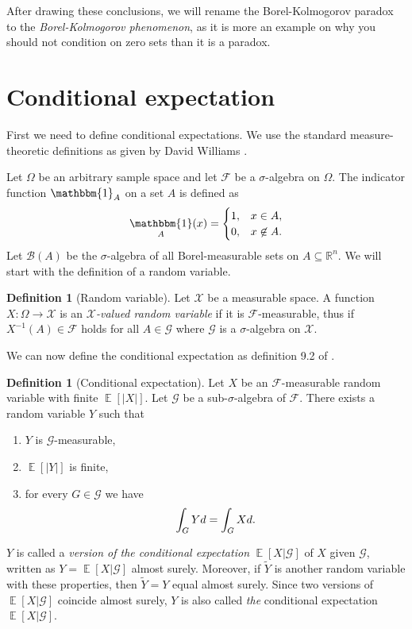 \documentclass[a4paper]{report}
\theoremstyle{plain}
\theoremstyle{definition}
\newtheorem{definition}[theorem]{Definition}
\theoremstyle{remark}
\numberwithin{equation}{chapter}
\newcommand{\R}{\mathbb{R}}
\let\P\relax
\DeclareMathOperator{\P}{\mathbb{P}}
\DeclareMathOperator{\E}{\mathbb{E}}
\DeclareMathOperator{\1}{\mathbbm{1}}
\newcommand{\F}{\mathcal{F}}
\renewcommand{\G}{\mathcal{G}}
\newcommand{\B}{\mathcal{B}}
\newcommand{\X}{\mathcal{X}}
\begin{document}
After drawing these conclusions, we will rename the Borel-Kolmogorov paradox to the \emph{Borel-Kolmogorov phenomenon}, as it is more an example on why you should not condition on zero sets than it is a paradox.

\section{Conditional expectation}
First we need to define conditional expectations. We use the standard measure-theoretic definitions as given by David Williams \cite{Williams91}.

Let $\Omega$ be an arbitrary sample space and let $\mathcal{F}$ be a $\sigma$-algebra on $\Omega$. The indicator function $\1_A$ on a set $A$ is defined as
\begin{equation}
\1_A(x)=\begin{cases}1,&x\in A,\\0,&x\not\in A.\end{cases}
\end{equation}
Let $\B(A)$ be the $\sigma$-algebra of all Borel-measurable sets on $A\subseteq\R^n$. We will start with the definition of a random variable.

\begin{definition}[Random variable]
Let $\X$ be a measurable space. A function $X\colon\Omega\to\X$ is an \emph{$\X$-valued random variable} if it is $\F$-measurable, thus if $X^{-1}(A)\in\F$ holds for all $A\in\G$ where $\G$ is a $\sigma$-algebra on $\X$.
\end{definition}

We can now define the conditional expectation as definition 9.2 of \cite{Williams91}.

\begin{definition}[Conditional expectation]\label{def:conexp}
Let $X$ be an $\F$-measurable random variable with finite $\E[|X|]$. Let $\G$ be a sub-$\sigma$-algebra of $\F$. There exists a random variable $Y$ such that
\begin{enumerate}
\item $Y$ is $\G$-measurable,
\item $\E[|Y|]$ is finite,
\item for every $G\in\G$ we have
\begin{equation}
\int_G Yd\P=\int_G Xd\P.
\end{equation}
\end{enumerate}
$Y$ is called a \emph{version of the conditional expectation} $\E[X|\G]$ of $X$ given $\G$, written as $Y=\E[X|\G]$ almost surely. Moreover, if $\tilde{Y}$ is another random variable with these properties, then $\tilde{Y}=Y$ equal almost surely. Since two versions of $\E[X|\G]$ coincide almost surely, $Y$ is also called \emph{the} conditional expectation $\E[X|\G]$.
\end{definition}
\end{document}
